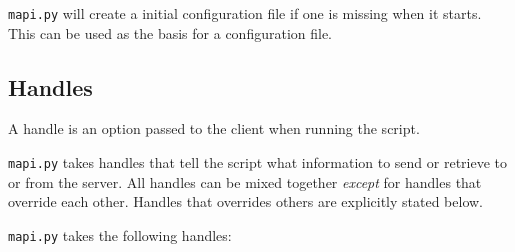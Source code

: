 \texttt{mapi.py} will create a initial configuration file if one is missing
when it starts. This can be used as the basis for a configuration file. 


\subsection{Handles}
\label{sec:handles}
A handle is an option passed to the client when running the script.

\texttt{mapi.py} takes handles that tell the script what information to send
or retrieve to or from the server. All handles can be mixed together
\textit{except} for handles that override each other. Handles that overrides
others are explicitly stated below.

\texttt{mapi.py} takes the following handles:

